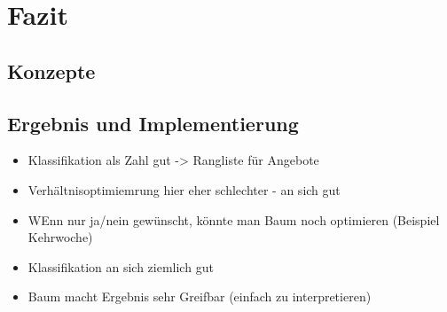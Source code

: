 \section{Fazit}\label{sec:fazit}
\subsection{Konzepte}


\subsection{Ergebnis und Implementierung}
\begin{itemize}
    \item Klassifikation als Zahl gut -> Rangliste für Angebote
    \item Verhältnisoptimiemrung hier eher schlechter - an sich gut
    \item WEnn nur ja/nein gewünscht, könnte man Baum noch optimieren (Beispiel Kehrwoche)
    \item Klassifikation an sich ziemlich gut
    \item Baum macht Ergebnis sehr Greifbar (einfach zu interpretieren)
\end{itemize}